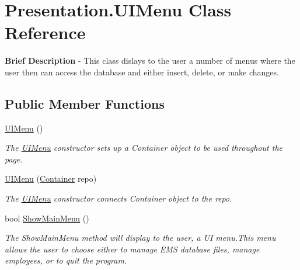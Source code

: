 \hypertarget{class_presentation_1_1_u_i_menu}{}\section{Presentation.\+U\+I\+Menu Class Reference}
\label{class_presentation_1_1_u_i_menu}


{\bfseries Brief Description} -\/ This class dislays to the user a number of menus where the user then can access the database and either insert, delete, or make changes.  


\subsection*{Public Member Functions}
\begin{DoxyCompactItemize}
\item 
\hyperlink{class_presentation_1_1_u_i_menu_aecce7fd9ed4696929cbcada2da8c4c2c}{U\+I\+Menu} ()
\begin{DoxyCompactList}\small\item\em The \hyperlink{class_presentation_1_1_u_i_menu}{U\+I\+Menu} constructor sets up a Container object to be used throughout the page. \end{DoxyCompactList}\item 
\hyperlink{class_presentation_1_1_u_i_menu_ac27724c06cbdcddbcf940f812ba307e3}{U\+I\+Menu} (\hyperlink{class_the_company_1_1_container}{Container} repo)
\begin{DoxyCompactList}\small\item\em The \hyperlink{class_presentation_1_1_u_i_menu}{U\+I\+Menu} constructor connects Container object to the repo. \end{DoxyCompactList}\item 
bool \hyperlink{class_presentation_1_1_u_i_menu_aa358c475a580c724b992458425649ada}{Show\+Main\+Menu} ()
\begin{DoxyCompactList}\small\item\em The Show\+Main\+Menu method will display to the user, a U\+I menu.\+This menu allows the user to choose either to manage E\+M\+S database files, manage employees, or to quit the program. \end{DoxyCompactList}\end{DoxyCompactItemize}

